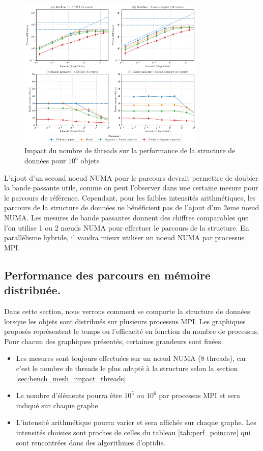 \begin{figure}
    \centering
    \includegraphics[width=0.8\textwidth]{img/bench_mesh_omp_effet_threads.pdf}
    \caption{Impact du nombre de threads sur la performance de la structure de données pour $10^6$ objets}
    \label{fig:bench_mesh_effet_threads}
\end{figure}

L'ajout d'un second noeud NUMA pour le parcours devrait permettre de doubler la bande passante utile, comme on peut l'observer dans une certaine mesure pour le parcours de référence. Cependant, pour les faibles intensités arithmétiques, les parcours de la structure de données ne bénéficient pas de l'ajout d'un 2eme nœud NUMA. Les mesures de bande passantes donnent des chiffres comparables que l'on utilise 1 ou 2 nœuds NUMA pour effectuer le parcours de la structure. En parallélisme hybride, il vaudra mieux utiliser un noeud NUMA par processus MPI.

\subsection{Performance des parcours en mémoire distribuée.}
\label{sec:bench_mesh_mpi}

Dans cette section, nous verrons comment se comporte la structure de données lorsque les objets sont distribués sur plusieurs processus MPI. Les graphiques proposés représentent le temps ou l'efficacité en fonction du nombre de processus. Pour chacun des graphiques présentés, certaines grandeurs sont fixées.
\begin{itemize}
    \item Les mesures sont toujours effectuées sur un nœud NUMA (8 threads), car c'est le nombre de threads le plus adapté à la structure selon la section \ref{sec:bench_mesh_impact_threads}
    \item Le nombre d'éléments pourra être $10^5$ ou $10^6$ par processus MPI et sera indiqué sur chaque graphe
    \item L'intensité arithmétique pourra varier et sera affichée sur chaque graphe. Les intensités choisies sont proches de celles du tableau \ref{tab:perf_poincare} qui sont rencontrées dans des algorithmes d'optidis.
\end{itemize}

